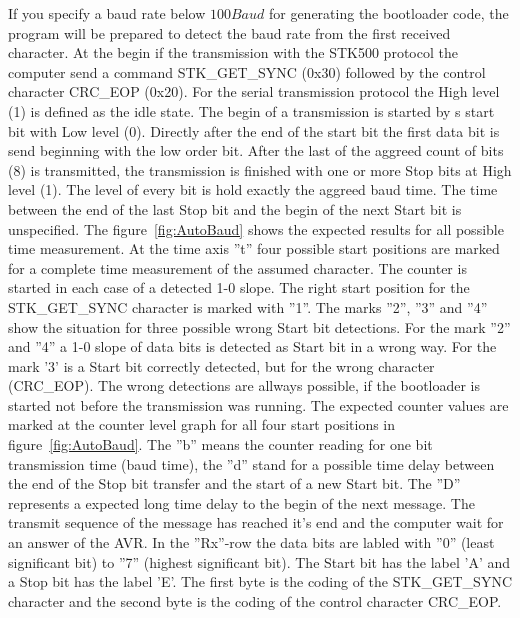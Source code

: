 If you specify a baud rate below \(100Baud\) for generating the bootloader code,
the program will be prepared to detect the baud rate from the first
received character.
At the begin if the transmission with the STK500 protocol the computer send
a command STK\_GET\_SYNC (0x30) followed by the control character CRC\_EOP (0x20).
For the serial transmission protocol the High level (1) is defined as the idle state.
The begin of a transmission is started by s start bit with Low level (0).
Directly after the end of the start bit the first data bit is send 
beginning with the low order bit. After the last of the aggreed count of bits (8)
is transmitted, the transmission is finished with one or more Stop bits at High level (1).
The level of every bit is hold exactly the aggreed baud time.
The time between the end of the last Stop bit and the begin of the next Start bit
is unspecified.
The figure~\ref{fig:AutoBaud} shows the expected results for all possible
time measurement. At the time axis ''t'' four possible start positions
are marked for a complete time measurement of the assumed character.
The counter is started in each case of a detected 1-0 slope.
The right start position for the STK\_GET\_SYNC character is marked with ''1''.
The marks ''2'', ''3'' and ''4'' show the situation for three possible
wrong Start bit detections.
For the mark ''2'' and ''4'' a 1-0 slope of data bits is detected as Start bit
in a wrong way. For the mark '3' is a Start bit correctly detected, but for the
wrong character (CRC\_EOP).
The wrong detections are allways possible, if the bootloader is started not
before the transmission was running.
The expected counter values are marked at the counter level graph for all
four start positions in figure~\ref{fig:AutoBaud}. 
The ''b'' means the counter reading for one bit transmission time (baud time),
the ''d'' stand for a possible time delay between the end of the Stop bit transfer 
and the start of a new Start bit.
The ''D'' represents a expected long time delay to the begin of the next message.
The transmit sequence of the message has reached it's end and the computer
wait for an answer of the AVR.
In the ''Rx''-row the data bits are labled with ''0'' (least significant bit)
to ''7'' (highest significant bit). The Start bit has the label 'A' and
a Stop bit has the label 'E'.
The first byte is the coding of the STK\_GET\_SYNC character and the second byte
is the coding of the control character CRC\_EOP.

